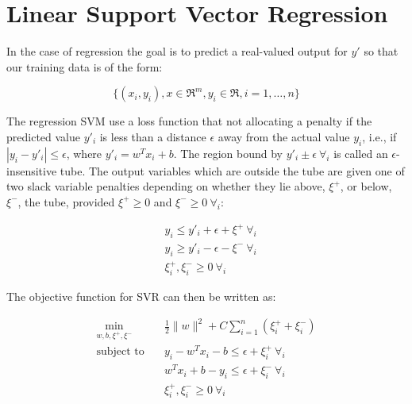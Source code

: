 \section{Linear Support Vector Regression} \label{section:svr}

In the case of regression the goal is to predict a real-valued output for $y'$ so that our training data is of the form:

\begin{equation}
	\{(x_i,y_i), x\in\Re^m, y_i\in\Re, i=1, \dots, n\} \label{eq:svr_data}
\end{equation}

The regression SVM use a loss function that not allocating a penalty if the predicted value $y'_i$ is less than a distance $\epsilon$ away from the actual value $y_i$, i.e., if $|y_i-y'_i| \leq \epsilon$, where $y'_i = w^T x_i + b$. The region bound by $y'_i\pm\epsilon \ \forall_i$ is called an $\epsilon$-insensitive tube. The output variables which are outside the tube are given one of two slack variable penalties depending on whether they lie above, $\xi^+$, or below, $\xi^-$, the tube, provided $\xi^+ \geq 0$ and $\xi^- \geq 0 \ \forall_i$:

\begin{equation} \label{eq:svr_consts}
	\begin{aligned}
		& y_i\leq y'_i+\epsilon+\xi^+ \ \forall_i \\
    	& y_i\geq y'_i-\epsilon-\xi^- \ \forall_i \\
    	& \xi_i^+, \xi_i^- \geq 0 \ \forall_i
	\end{aligned}
\end{equation}

The objective function for SVR can then be written as:

\begin{equation} \label{eq:quad_svr_obj}
    \begin{aligned}
        \min_{w,b,\xi^+,\xi^-} \quad & \frac{1}{2} \| w \|^2 + C \sum_{i=1}^n (\xi_i^+ + \xi_i^-) \\
            \text{subject to} \quad & y_i - w^T x_i - b \leq \epsilon + \xi_i^+ \ \forall_i \\ & w^T x_i + b - y_i \leq \epsilon + \xi_i^- \ \forall_i \\ & \xi_i^+, \xi_i^- \geq 0 \ \forall_i
    \end{aligned}
\end{equation}

